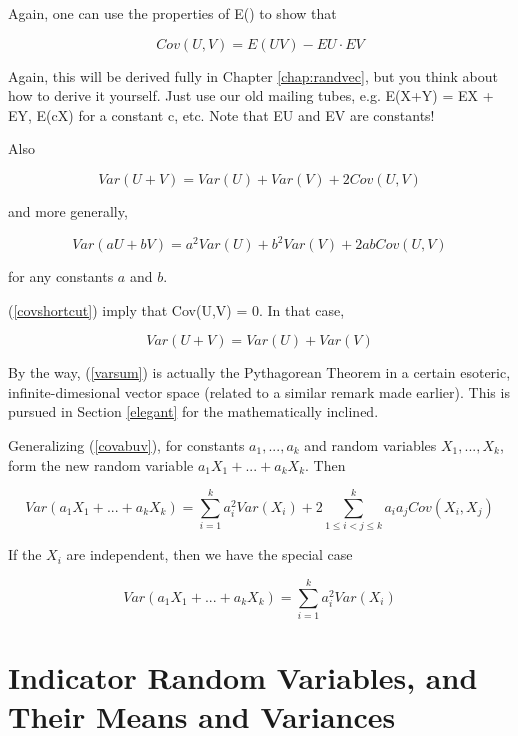 Again, one can use the properties of E() to show that

\begin{equation}
\label{covshortcut}
Cov(U,V) = E(UV) - EU \cdot EV
\end{equation}

Again, this will be derived fully in Chapter \ref{chap:randvec}, but you
think about how to derive it yourself.  Just use our old mailing tubes,
e.g. E(X+Y) = EX + EY, E(cX) for a constant c, etc.  Note that EU and EV
are constants!

Also 

\begin{equation}
\label{genvarsum}
Var(U+V) = Var(U) + Var(V) + 2 Cov(U,V)
\end{equation}

and more generally,

\begin{equation}
\label{covabuv}
Var(aU+bV) = a^2 Var(U) + b^2 Var(V) + 2ab Cov(U,V)
\end{equation}

for any constants $a$ and $b$.

(\ref{covshortcut}) imply that Cov(U,V) = 0.  In that case,

\begin{equation}
\label{varsum}
Var(U+V) = Var(U) + Var(V) 
\end{equation}

By the way, (\ref{varsum}) is actually the Pythagorean Theorem in a
certain esoteric, infinite-dimesional vector space (related to a similar
remark made earlier).  This is pursued in Section \ref{elegant} for
the mathematically inclined.

Generalizing (\ref{covabuv}), for constants $a_1,...,a_k$ and random
variables $X_1,...,X_k$, form the new random variable $a_1 X_1 +...+ a_k
X_k$.  Then

\begin{equation}
Var(a_1 X_1 +...+ a_k X_k) = 
\sum_{i=1}^k a_i^2 Var(X_i) + 2 \sum_{1 \leq i < j \leq k}^k
a_i a_j Cov(X_i,X_j)
\end{equation}

If the $X_i$ are independent, then we have the special case

\begin{equation}
Var(a_1 X_1 +...+ a_k X_k) = 
\sum_{i=1}^k a_i^2 Var(X_i) 
\end{equation}

\section{Indicator Random Variables, and Their Means and Variances}
\label{indicator}

